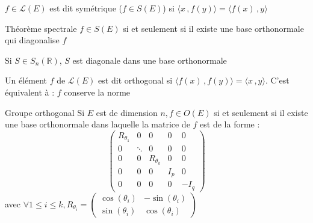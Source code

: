 \documentclass[french, a4paper, 11pt, twocolumn]{article}
\newcommand{\scal}[2]{\langle #1\, ,#2 \rangle}
\newcommand{\R}{\mathbb{R}}   %
\begin{document}
\begin{definition}
  \(f \in \mathcal{L}(E)\) est dit symétrique (\(f\in S(E)\)) si \(\scal{x}{f(y)}=\scal{f(x)}{y}\)
\end{definition}

\begin{theorem}{Théorème spectrale}
  \(f \in S(E)\) si et seulement si il existe une base orthonormale qui diagonalise \(f\)
  
  \tcblower

  Si \(S \in S_n(\R)\), \(S\) est diagonale dans une base orthonormale
\end{theorem}

\begin{definition}
  Un élément \(f\) de \(\mathcal{L}(E)\) est dit orthogonal si \(\scal{f(x)}{f(y)}=\scal{x}{y}\).
  C'est équivalent à : \(f\) conserve la norme
\end{definition}

\begin{theorem}{Groupe orthogonal}
  Si \(E\) est de dimension \(n, f \in O(E)\) si et seulement si
  il existe une base orthonormale dans laquelle la matrice de \(f\) est de la forme :
  \[\begin{pmatrix}
    R_{\theta_1} & 0 & 0 & 0 & 0 \\
    0 & \ddots & 0 & 0 & 0 \\
    0 & 0 & R_{\theta_k} & 0 & 0 \\
    0 & 0 & 0 & I_p & 0 \\
    0 & 0 & 0 & 0 & -I_q
  \end{pmatrix}\]
  avec \(\forall 1\leq i\leq k,
  R_{\theta_i}=\begin{pmatrix}
    \cos(\theta_i) & -\sin(\theta_i) \\
    \sin(\theta_i) & \cos(\theta_i)
  \end{pmatrix}\)
\end{theorem}
\end{document}

